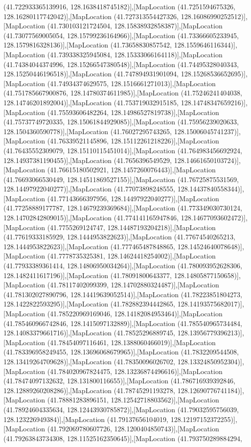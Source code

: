 (41.722933365139916, 128.1638418745182)],[MapLocation (41.7251594675326, 128.16280117742042)],[MapLocation (41.727313554427326, 128.16086990252512)],[MapLocation (41.730103121724504, 128.15838932858387)],[MapLocation (41.73077569005054, 128.15799236164966)],[MapLocation (41.73366605233945, 128.1579816328136)],[MapLocation (41.73658830857542, 128.1559646116344)],[MapLocation (41.739338325945084, 128.15333066164118)],[MapLocation (41.74384044374996, 128.15266547380548)],[MapLocation (41.74495328040343, 128.15250446196518)],[MapLocation (41.747894931901094, 128.15268536652695)],[MapLocation (41.74934374629575, 128.1516661271013)],[MapLocation (41.751785667900876, 128.14780374611985)],[MapLocation (41.75246241404038, 128.14746201892004)],[MapLocation (41.753719032915185, 128.14748347659216)],[MapLocation (41.75593606482264, 128.14986527819738)],[MapLocation (41.75737749720335, 128.15061844929085)],[MapLocation (41.75956239020633, 128.1504360590778)],[MapLocation (41.76027295743265, 128.15006045741237)],[MapLocation (41.76339521145896, 128.15112261218226)],[MapLocation (41.76435552309079, 128.15110115451014)],[MapLocation (41.764983456692924, 128.14937381190455)],[MapLocation (41.7656396549529, 128.14661650103724)],[MapLocation (41.76615180502921, 128.1457260076443)],[MapLocation (41.76693066530449, 128.14511869527155)],[MapLocation (41.76725875531569, 128.14497922040277)],[MapLocation (41.77073898248555, 128.14437840558344)],[MapLocation (41.77143666397956, 128.14497922040277)],[MapLocation (41.77258889177787, 128.14679239369684)],[MapLocation (41.773349030730124, 128.14702842809015)],[MapLocation (41.774141165947846, 128.14677093602472)],[MapLocation (41.7755269124747, 128.14487193204218)],[MapLocation (41.77619333185929, 128.1444953822623)],[MapLocation (41.77674540265213, 128.1444953822623)],[MapLocation (41.777465487848865, 128.14524640078648)],[MapLocation (41.7778735325381, 128.14624418254002)],[MapLocation (41.77933389361414, 128.14806950034264)],[MapLocation (41.780093952628306, 128.1482411617196)],[MapLocation (41.78091800643377, 128.14805877150658)],[MapLocation (41.78117402099399, 128.14702880324487)],[MapLocation (41.781302027890796, 128.14419639052514)],[MapLocation (41.78223851804273, 128.1422822593295)],[MapLocation (41.782882394442865, 128.14193575682017)],[MapLocation (41.785220969169046, 128.14182084953464)],[MapLocation (41.785460966742846, 128.1415097132889)],[MapLocation (41.785540965734484, 128.14083379661716)],[MapLocation (41.78525296889745, 128.13956779396213)],[MapLocation (41.78454097116461, 128.1388060466019)],[MapLocation (41.783396958249455, 128.13696068679965)],[MapLocation (41.7832209544508, 128.13419264709628)],[MapLocation (41.78350096026702, 128.13324850952304)],[MapLocation (41.784020967824475, 128.13236874496616)],[MapLocation (41.78474097132632, 128.131800116655)],[MapLocation (41.786716939392846, 128.12889260208286)],[MapLocation (41.78745291193278, 128.12690776741184)],[MapLocation (41.78881283896151, 128.12542718803562)],[MapLocation (41.78924604335634, 128.12443930785872)],[MapLocation (41.79032595756039, 128.123226949384)],[MapLocation (41.79137656104019, 128.12197152372255)],[MapLocation (41.792069780607726, 128.1200404850743)],[MapLocation (41.79263843734308, 128.11525162350645)],[MapLocation (41.793750289884294, 